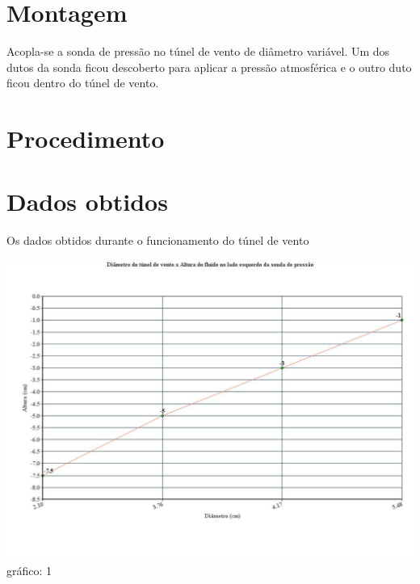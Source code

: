 \documentclass[a4paper]{article}
\begin{document}
\section{Montagem}
    Acopla-se a sonda de pressão no túnel de vento de diâmetro variável. Um dos dutos da sonda ficou descoberto para aplicar a pressão atmosférica e o outro duto ficou dentro do túnel de vento.

\section{Procedimento}

\section{Dados obtidos}
    Os dados obtidos durante o funcionamento do túnel de vento
    \begin{center}
          \includegraphics[width=\linewidth]{img/graphHeight.jpg}
          \label{graph}{gráfico: 1}
    \end{center}
\end{document}
